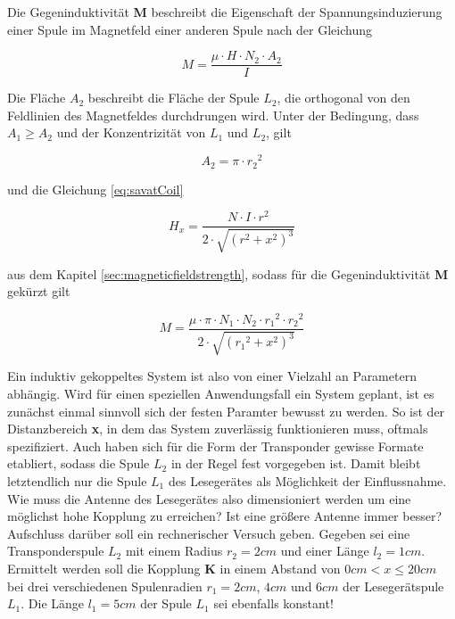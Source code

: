 {{\noindent Die Gegeninduktivität \textbf{M} beschreibt die Eigenschaft der Spannungsinduzierung einer Spule im Magnetfeld einer anderen Spule nach der Gleichung

\begin{equation}
  M = \frac{\mu \cdot H \cdot N_2 \cdot A_2}{I}
\end{equation}

\noindent Die Fläche \(A_2\) beschreibt die Fläche der Spule \(L_2\), die orthogonal von den Feldlinien des Magnetfeldes durchdrungen wird. Unter der Bedingung, dass \(A_1 \geq A_2\) und der Konzentrizität von \(L_1\) und \(L_2\), gilt

\begin{equation}
  A_2 = \pi \cdot {r_2}^2
\end{equation}

\noindent und die Gleichung \eqref{eq:savatCoil}

\begin{equation}
  H_x = \frac{N \cdot I \cdot r^2}{2 \cdot \sqrt{(r^2 + x^2)^3}}
\end{equation}

\noindent aus dem Kapitel \ref{sec:magneticfieldstrength}, sodass für die Gegeninduktivität \textbf{M} gekürzt gilt

\begin{equation}
  M = \frac{\mu \cdot \pi \cdot N_1 \cdot N_2 \cdot {r_1}^2 \cdot {r_2}^2}{2 \cdot \sqrt{({r_1}^2 + x^2)^3}}
  \label{eq:mutualInductance}
\end{equation}

\noindent Ein induktiv gekoppeltes System ist also von einer Vielzahl an Parametern abhängig. Wird für einen speziellen Anwendungsfall ein System geplant, ist es zunächst einmal sinnvoll sich der festen Paramter bewusst zu werden. So ist der Distanzbereich \textbf{x}, in dem das System zuverlässig funktionieren muss, oftmals spezifiziert. Auch haben sich für die Form der Transponder gewisse Formate etabliert, sodass die Spule \(L_2\) in der Regel fest vorgegeben ist. Damit bleibt letztendlich nur die Spule \(L_1\) des Lesegerätes als Möglichkeit der Einflussnahme. Wie muss die Antenne des Lesegerätes also dimensioniert werden um eine möglichst hohe Kopplung zu erreichen? Ist eine größere Antenne immer besser? Aufschluss darüber soll ein rechnerischer Versuch geben. Gegeben sei eine Transponderspule \(L_2\) mit einem Radius \(r_2 = 2cm\) und einer Länge \(l_2 = 1cm\). Ermittelt werden soll die Kopplung \textbf{K} in einem Abstand von \(0cm < x \leq 20cm\) bei drei verschiedenen Spulenradien \(r_1 = 2cm\), \(4cm\) und \(6cm\) der Lesegerätspule \(L_1\). Die Länge \(l_1 = 5cm\) der Spule \(L_1\) sei ebenfalls konstant! 

}}
